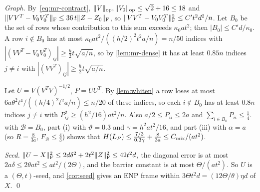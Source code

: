 \emph{Graph.} By~\eqref{eq:mr-contract}, $\lVert V\rVert_{\mathrm{op}},\lVert V_0\rVert_{\mathrm{op}}\le\sqrt2+16\le18$
and
$\lVert VV^T-V_0V_0^T\rVert_{\mathrm F}\le36\,t\lVert Z-Z_0\rVert_{\mathrm F}$, so
$\lVert VV^T-V_0V_0^T\rVert_{\mathrm F}^2\le C't^2d^2/n$. Let $B_0$ be the set of rows whose
contribution to this sum exceeds $\kappa_0at^2$; then $|B_0|\le C'd/\kappa_0$. A row
$i\notin B_0$ has at most $\kappa_0at^2/((h/2)^2t^2a/n)=n/50$ indices with
$|(VV^T-V_0V_0^T)_{ij}|\ge\frac h2t\sqrt{a/n}$, so by \cref{lem:mr-dense} it has at
least $0.85n$ indices $j\ne i$ with $|(VV^T)_{ij}|\ge\frac h2t\sqrt{a/n}$.

Let $U=V(V^TV)^{-1/2}$, $P=UU^T$. By \cref{lem:whiten} a row loses at most
$6a\theta^2t^4/((h/4)^2t^2a/n)\le n/20$ of these indices, so each $i\notin
B_0$ has at least $0.8n$ indices $j\ne i$ with $P_{ij}^2\ge(h^2/16)at^2/n$.
Also $a/2\le P_{ii}\le2a$ and $\sum_{i\in B_0}P_{ii}\le\frac14$.
 with $\mathcal B=B_0$, part (i) with $\vartheta=0.3$ and
$\gamma=h^2at^2/16$, and part (iii) with $\alpha=a$ (so $R=\frac8{3a}$,
$F_{\mathcal B}\le\frac43$) shows that
$H(L_P)\le\frac{7/3}{0.3\gamma}+\frac8{3a}\le C_{\rm mix}/(at^2)$.

\emph{Seed.} $\lVert U-X\rVert_{\mathrm F}^2\le2d\delta^2+2t^2\lVert Z\rVert_{\mathrm F}^2\le42t^2d$, the diagonal error
is at most $2a\delta\le2\theta at^2\le at^2/(2\Theta)$, and the barrier constant
is at most $\Theta/(at^2)$. So $U$ is a $(\Theta,t)$-seed, and
\cref{cor:seed} gives an ENP frame within $3\Theta t^2d=(12\Theta/\theta)\eta d$
of $X$.
\qed
